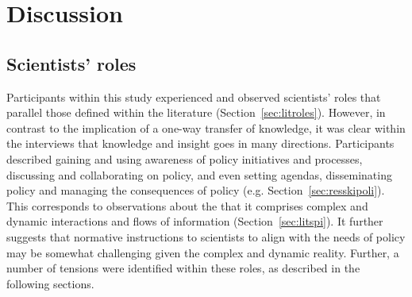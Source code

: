 \chapter{Discussion}\label{ch:discussion}



\section{Scientists' roles}\label{sec:disroles}

Participants within this study experienced and observed scientists' roles that parallel those defined within the literature (Section~\ref{sec:litroles}). However, in contrast to the implication of a one-way transfer of knowledge, it was clear within the interviews that knowledge and insight goes in many directions. Participants described gaining and using awareness of policy initiatives and processes, discussing and collaborating on policy, and even setting agendas, disseminating policy and managing the consequences of policy (e.g. Section~\ref{sec:resskipoli}). This corresponds to observations about the \SPI{} that it comprises complex and dynamic interactions and flows of information (Section~\ref{sec:litspi}). It further suggests that normative instructions to scientists to align with the needs of policy may be somewhat challenging given the complex and dynamic reality. Further, a number of tensions were identified within these roles, as described in the following sections. 

